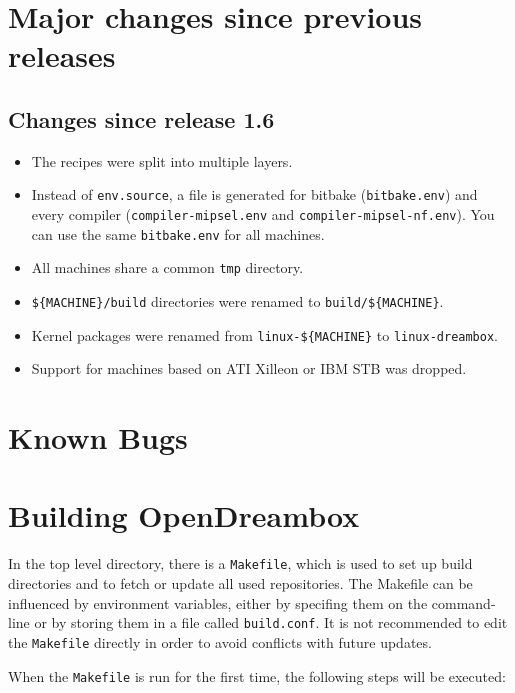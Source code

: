 \documentclass[a4paper]{article}
\newcommand{\shell}[1]{\texttt{\small #1}}
\begin{document}
\pagebreak

\section{Major changes since previous releases}

  \subsection{Changes since release 1.6}
    \begin{itemize}
      \item The recipes were split into multiple layers.
      \item Instead of \shell{env.source}, a file is generated for bitbake
        (\shell{bitbake.env}) and every compiler (\shell{compiler-mipsel.env}
        and \shell{compiler-mipsel-nf.env}). You can use the same
        \shell{bitbake.env} for all machines.
      \item All machines share a common \shell{tmp} directory.
      \item \shell{\$\{MACHINE\}/build} directories were renamed to \shell{build/\$\{MACHINE\}}.
      \item Kernel packages were renamed from \shell{linux-\$\{MACHINE\}} to \shell{linux-dreambox}.
      \item Support for machines based on ATI Xilleon or IBM STB was dropped.
    \end{itemize}

\section{Known Bugs}

\pagebreak

\section{Building OpenDreambox}

  In the top level directory, there is a \shell{Makefile}, which is used to
  set up build directories and to fetch or update all used repositories.
  The Makefile can be influenced by environment variables, either
  by specifing them on the command-line or by storing them in a file called
  \shell{build.conf}. It is not recommended to edit the \shell{Makefile} directly
  in order to avoid conflicts with future updates.

  When the \shell{Makefile} is run for the first time, the following steps will
  be executed:
\end{document}
